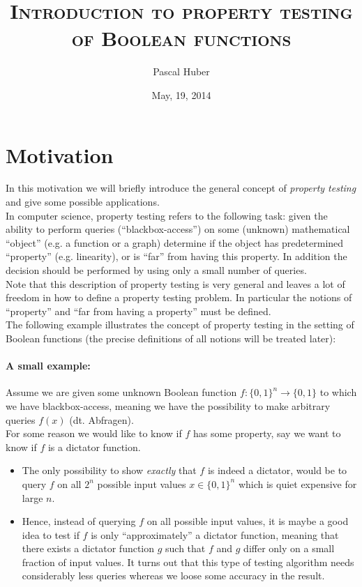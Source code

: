 \documentclass[a4paper]{article}
\theoremstyle{plain}
\theoremstyle{definition}
\theoremstyle{remark}
\begin{document}
\title{\textsc{Introduction to property testing of Boolean functions}}
\author{Pascal Huber}
\date{May, 19, 2014}
\maketitle

\section{Motivation}
\label{sec:motivation}

In this motivation we will briefly introduce the general concept of
\emph{property testing} and give some possible applications. \\

\noindent In computer science, property testing refers to the following
task: given the ability to perform queries (``blackbox-access'') on
some (unknown) mathematical ``object'' (e.g. a function or a graph)
determine if the object has predetermined ``property''
(e.g. linearity), or is ``far'' from having this property. In addition
the decision should be performed by using only a small number of
queries. \\ 

\noindent Note that this description of property testing is very
general and leaves a lot of freedom in how to define a property
testing problem. In particular the notions of ``property'' and ``far
from having a property'' must be defined. \\ 
The following example illustrates the concept of property testing in
the setting of Boolean functions (the precise definitions of all
notions will be treated later): 

\paragraph{A small example:}
 Assume we are given some unknown Boolean
function \(f: \{0,1\}^n \rightarrow \{0,1\}\) to which we have
blackbox-access, meaning we have the possibility to make arbitrary
queries \(f(x)\) (dt. Abfragen). \\
For some reason we would like to know if \(f\) has some property, say
we want to know if \(f\) is a dictator function.

\begin{itemize}
\item The only possibility to show \emph{exactly} that \(f\) is indeed a
  dictator, would be to query \(f\) on all \(2^n\) possible input
  values \(x\in \{0,1\}^n\) which is quiet expensive for large
  \(n\).
\item Hence, instead of querying \(f\) on all possible input values, it is
  maybe a good idea to test if \(f\) is only ``approximately'' a
  dictator function, meaning that there exists a dictator function \(g\)
  such that \(f\) and \(g\) differ only on a small fraction of input
  values. It turns out that this type of testing algorithm needs
  considerably less queries whereas we loose some accuracy in the
  result. 
\end{itemize}
\end{document}
